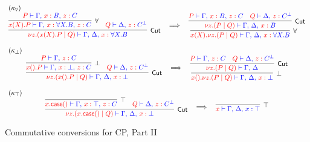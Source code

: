 \begin{figure*}
\[\begin{array}{c}
\\~\\
\multicolumn{1}{l}{(\kappa_{\forall})} \\
\vcenter{
  \inference{
    \inference{
      \tm{P} \tpvdash \tp{\Gamma \comma \tmof{x}B \comma \tmof{z}C}
    }{\forall}{
      \tm{x(X).P} \tpvdash
        \tp{\Gamma \comma \tmof{x}\all{X}B \comma \tmof{z}C}
    }
    &
    \tm{Q} \tpvdash \tp{\Delta \comma \tmof{z}C^\bot}
  }{Cut}{
    \tm{\nu z \Of{C}.(x(X).P \mid Q)} \tpvdash
      \tp{\Gamma \comma \Delta \comma \tmof{x}\all{X}B}
  }
}
\quad \becomes \quad
\vcenter{
  \inference{
    \inference{
      \tm{P} \tpvdash \tp{\Gamma \comma \tmof{x}B \comma \tmof{z}C}
      &
      \tm{Q} \tpvdash \tp{\Delta \comma \tmof{z}C^\bot}
    }{Cut}{
      \tm{\nu z \Of{C}.(P \mid Q)} \tpvdash
        \tp{\Gamma \comma \Delta \comma \tmof{x}B}
    }
  }{\forall}{
    \tm{x(X).\nu z \Of{C}.(P \mid Q)} \tpvdash
      \tp{\Gamma \comma \Delta \comma \tmof{x}\all{X}B}
  }
}

\\~\\

\multicolumn{1}{l}{(\kappa_{\bot})} \\
\vcenter{
  \inference{
    \inference{
      \tm{P} \tpvdash \tp{\Gamma \comma \tmof{z}C}
    }{\bot}{
      \tm{x().P} \tpvdash \tp{\Gamma \comma \tmof{x}\bot \comma \tmof{z}C}
    }
    &
    \tm{Q} \tpvdash \tp{\Delta \comma \tmof{z}C^\bot}
  }{Cut}{
    \tm{\nu z \Of{C}.(x().P \mid Q)} \tpvdash
      \tp{\Gamma \comma \Delta \comma \tmof{x}\bot}
  }
}
\quad \becomes \quad
\vcenter{
  \inference{
    \inference{
      \tm{P} \tpvdash \tp{\Gamma \comma \tmof{z}C}
      &
      \tm{Q} \tpvdash \tp{\Delta \comma \tmof{z}C^\bot}
    }{Cut}{
      \tm{\nu z \Of{C}.(P \mid Q)} \tpvdash \tp{\Gamma \comma \Delta}
    }
  }{\bot}{
      \tm{x().\nu z \Of{C}.(P \mid Q)} \tpvdash
        \tp{\Gamma \comma \Delta \comma \tmof{x}\bot}
  }
}

\\~\\

\multicolumn{1}{l}{(\kappa_{\top})} \\
\vcenter{
  \inference{
    \inference{}{\top}{
      \tm{x.\caseterm()} \tpvdash
        \tp{\Gamma \comma \tmof{x}\top \comma \tmof{z}C}
    }
    &
    \tm{Q} \tpvdash \tp{\Delta \comma \tmof{z}C^\bot}
  }{Cut}{
    \tm{\nu z \Of{C}.(x.\caseterm() \mid Q)} \tpvdash
      \tp{\Gamma \comma \Delta \comma \tmof{x}\bot}
  }
}
\quad \becomes \quad
\vcenter{
  \inference{}{\top}{
    \tm{x} \tpvdash \tp{\Gamma \comma \Delta \comma x:\top}
  }
}

\end{array}
\]
\caption{Commutative conversions for CP, Part II}
\label{fig:commutetwo}
\end{figure*}
